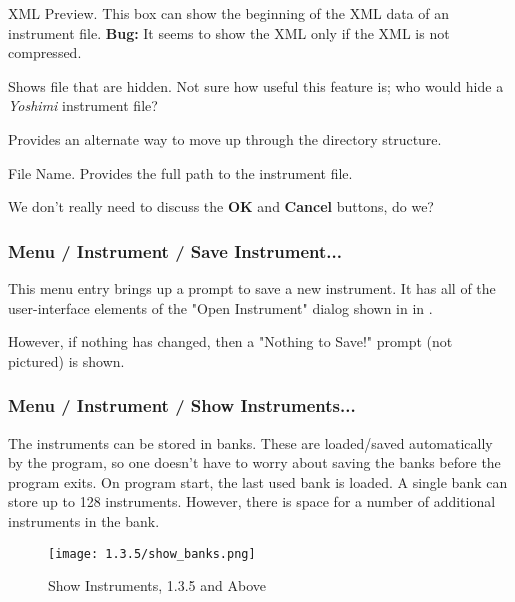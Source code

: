    XML Preview.
   This box can show the beginning of the XML data of an instrument file.
   \textbf{Bug:}
   It seems to show the XML only if the XML is not compressed.

   Shows file that are hidden.  Not sure how useful this feature is;
   who would hide a \textsl{Yoshimi} instrument file?

   Provides an alternate way to move up through the directory structure.

   File Name.
   Provides the full path to the instrument file.

   We don't really need to discuss the \textbf{OK} and \textbf{Cancel}
   buttons, do we?

\subsubsection{Menu / Instrument / Save Instrument...}
\label{subsubsec:menu_instrument_save}

   This menu entry brings up a prompt to save a new instrument.
   It has all of the user-interface elements of the "Open Instrument"
   dialog shown in
   in .

   However, if nothing has changed, then a "Nothing to Save!" prompt (not
   pictured) is shown.

\subsubsection{Menu / Instrument / Show Instruments...}
\label{subsubsec:menu_instrument_show}

   The instruments can be stored in banks. These are loaded/saved
   automatically by the program, so one doesn't have to worry about saving the
   banks before the program exits. On program start, the last used bank is
   loaded. A single bank can store up to 128 instruments. 
   However, there is space for a number of additional
   instruments in the bank.


\begin{figure}[H]
   \centering 
   \texttt{[image: 1.3.5/show\_banks.png]}
   \caption[Show Instruments]{Show Instruments, 1.3.5 and Above}
   \label{fig:show_instruments}
\end{figure}

